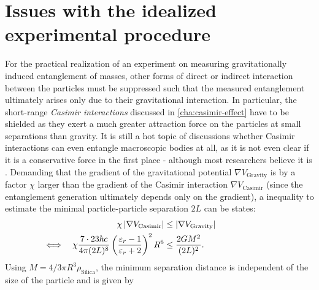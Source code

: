 \section{Issues with the idealized experimental procedure}\label{sec:2:experimental-problems}

For the practical realization of an experiment on measuring gravitationally induced entanglement of masses, other forms of direct or indirect interaction between the particles must be suppressed such that the measured entanglement ultimately arises only due to their gravitational interaction.
In particular, the short-range \emph{Casimir interactions} \cite{Casimir_1948} discussed in \cref{cha:casimir-effect} have to be shielded as they exert a much greater attraction force on the particles at small separations than gravity.
It is still a hot topic of discussions whether Casimir interactions can even entangle macroscopic bodies at all, as it is not even clear if it is a conservative force in the first place - although most researchers believe it is \cite{DeBiase_2012,Yi_2023}.
Demanding that the gradient of the gravitational potential $\nabla V_\mathrm{Gravity}$ is by a factor $\chi$ larger than the gradient of the Casimir interaction $\nabla V_\mathrm{Casimir}$ \cite{Emig_2007} (since the entanglement generation ultimately depends only on the gradient), a inequality to estimate the minimal particle-particle separation $2L$ can be states:
\begin{align}
  \chi \left\lvert\nabla V_\mathrm{Casimir}\right\rvert &\leq \left\lvert\nabla V_\mathrm{Gravity}\right\rvert \\
  \Longleftrightarrow \quad \chi \frac{7 \cdot 23 \hbar c}{4\pi (2L)^8} \left(\frac{\varepsilon_r - 1}{\varepsilon_r + 2}\right)^2 R^6 &\leq \frac{2 G M^2}{(2L)^2} . \qquad\qquad\qquad\qquad
\end{align}
Using $M = 4/3 \pi R^3\rho_\mathrm{Silica}$, the minimum separation distance is independent of the size of the particle and is given by
